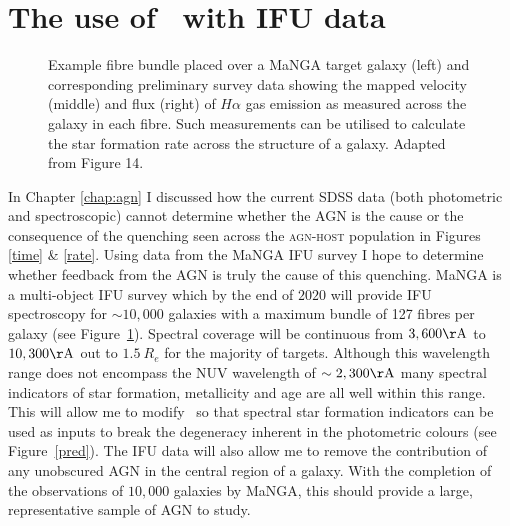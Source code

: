 \section{The use of \starpy\ with IFU data}\label{sec:IFU}

\begin{figure}
\caption[MaNGA fibre bundle with example emission data]{Example fibre bundle placed over a MaNGA target galaxy (left) and corresponding preliminary survey data showing the mapped velocity (middle) and flux (right) of $H\alpha$ gas emission as measured across the galaxy in each fibre. Such measurements can be utilised to calculate the star formation rate across the structure of a galaxy. Adapted from \cite{bundy15} Figure 14.}
\label{fig:manga}
\end{figure}

In Chapter \ref{chap:agn} I discussed how the current SDSS data (both photometric and spectroscopic) cannot determine whether the AGN is the cause or the consequence of the quenching seen across the \textsc{agn-host} population in Figures \ref{time} \& \ref{rate}. Using data from the MaNGA IFU survey \citep{bundy15} I hope to determine whether feedback from the AGN is truly the cause of this quenching. MaNGA is a multi-object IFU survey which by the end of $2020$ will provide IFU spectroscopy for $\sim10,000$ galaxies with a maximum bundle of 127 fibres per galaxy (see Figure~\ref{fig:manga}). Spectral coverage will be continuous from $3,600\rm{\AA}$ to $10,300\rm{\AA}$ out to $1.5~R_e$ for the majority of targets. Although this wavelength range does not encompass the NUV wavelength of $\sim2,300\rm{\AA}$ many spectral indicators of star formation, metallicity and age are all well within this range. This will allow me to modify \starpy\ so that spectral star formation indicators \citep[such as $H\alpha$;][]{kennicutt94} can be used as inputs to break the degeneracy inherent in the photometric colours (see Figure~\ref{pred}). The IFU data will also allow me to remove the contribution of any unobscured AGN in the central region of a galaxy. With the completion of the observations of $10,000$ galaxies by MaNGA, this should provide a large, representative sample of AGN to study.

